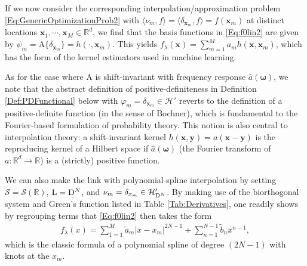 \documentclass[11pt, english,english]{article}
\newcommand{\R}{ \mathbb{R}}
\newcommand{\Lop}{{\rm L}}
\newcommand{\Dop}{{\rm D}}
\newcommand{\bw}{{\boldsymbol \omega}}
\def\V#1{{\boldsymbol{#1}}}         %
\def\Spc#1{{\mathcal{#1}}}  %
\def\Op#1{{\mathrm{#1}}}  %
\renewcommand{\[}{\begin{equation}}
\renewcommand{\]}[1]{\label{eq:#1}\end{equation}}
\begin{document}
If we now consider the corresponding interpolation/approximation problem \eqref{Eq:GenericOptimizationProb2} with $\langle\nu_m, f\rangle=\langle \delta_{\V x_m}, f\rangle=f(\V x_m)$
at distinct locations $\V x_1, \cdots,\V x_M \in \R^d$, we find that the basis functions in \eqref{Eq:f0lin2} are given by
$\psi_m=\Op A\{\delta_{\V x_m}\}=h(\cdot,\V x_m)$.
This yields $f_\lambda(\V x)=\sum_{m=1}^M a_m h(\V x,\V x_m)$, which has the form of the kernel estimators used in machine learning.

As for the case where $\Op A$ is shift-invariant with frequency response $\widehat a(\bw)$, we note that the abstract definition of positive-definiteness in Definition \ref{Def:PDFunctional} below
with $\varphi_m=\delta_{\V x_m} \in \Spc H'$
reverts to the definition of a positive-definite function (in the sense of Bochner), which is fundamental to the Fourier-based formulation of probability theory. This notion is also central to interpolation theory: a shift-invariant kernel $h(\V x,\V y)=a(\V x- \V y)$ is the reproducing kernel of a Hilbert space if $\widehat a(\bw)$ (the Fourier transform of $a: \R^d\to \R$) is a (strictly) positive function.

We can also make the link with polynomial-spline interpolation by setting $\Spc S=\Spc S(\R)$, $\Lop=\Dop^N$, and 
$\nu_m=\delta_{x_m} \in \Spc H'_{\Dop^N}$. By making use of the biorthogonal system and Green's function listed in Table \ref{Tab:Derivatives}, one readily shows by regrouping terms that \eqref{Eq:f0lin2} then takes the form
\begin{align}
f_\lambda(x)=\sum_{1=1}^M \tilde{a}_m |x-x_m|^{2N-1} +
 \sum_{n=1}^{N-1} \tilde{b}_n x^{n-1},
\end{align}
which is the classic formula of a polynomial spline of degree $(2N-1)$ with knots at the $x_m$.
\end{document}
